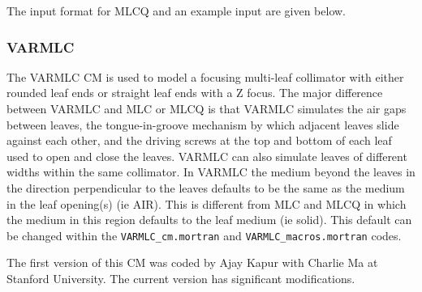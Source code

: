 \documentclass[12pt,twoside]{article}
\begin{document}

\clearpage

The input format for MLCQ and an example input are given below.
\begin{small}

\end{small}




\subsubsection{VARMLC}
\label{varmlc}
\renewcommand{\rightmark}{VARMLC CM}
The VARMLC CM is used to model a focusing multi-leaf collimator
with either rounded leaf
ends or straight leaf ends with a Z focus.  The major difference between
VARMLC and MLC or MLCQ is that
VARMLC simulates the air gaps between leaves, the tongue-in-groove
mechanism by which adjacent leaves slide against each other, and the
driving screws at the top and bottom of each leaf used to open and close
the leaves.  VARMLC can also simulate leaves of different widths within
the same collimator.
In VARMLC the medium beyond the leaves in the direction perpendicular
to the leaves defaults to be the same as the medium in the leaf opening(s)
(ie AIR).  This is different from MLC and MLCQ in which the medium in this
region defaults to the leaf medium (ie solid).  This default can be changed
within the {\tt VARMLC\_cm.mortran} and {\tt VARMLC\_macros.mortran} codes.

The first version of this CM was coded by Ajay Kapur with Charlie Ma
at Stanford University.  The current version has significant
modifications.
\end{document}

